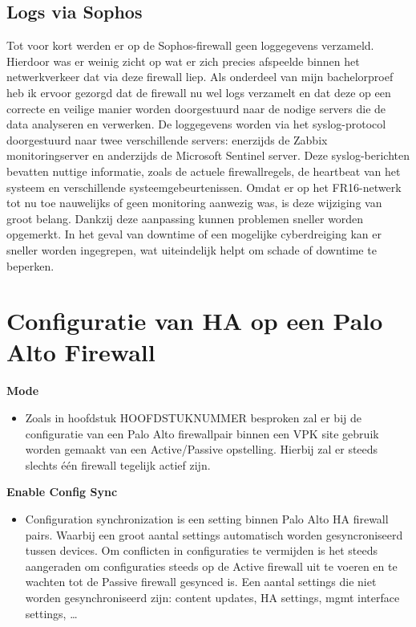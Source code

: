 \subsection{Logs via Sophos}
Tot voor kort werden er op de Sophos-firewall geen loggegevens verzameld. Hierdoor was er weinig zicht op wat er zich precies afspeelde binnen het netwerkverkeer dat via deze firewall liep. Als onderdeel van mijn bachelorproef heb ik ervoor gezorgd dat de firewall nu wel logs verzamelt en dat deze op een correcte en veilige manier worden doorgestuurd naar de nodige servers die de data analyseren en verwerken.
De loggegevens worden via het syslog-protocol doorgestuurd naar twee verschillende servers: enerzijds de Zabbix monitoringserver en anderzijds de Microsoft Sentinel server. Deze syslog-berichten bevatten nuttige informatie, zoals de actuele firewallregels, de heartbeat van het systeem en verschillende systeemgebeurtenissen.
Omdat er op het FR16-netwerk tot nu toe nauwelijks of geen monitoring aanwezig was, is deze wijziging van groot belang. Dankzij deze aanpassing kunnen problemen sneller worden opgemerkt. In het geval van downtime of een mogelijke cyberdreiging kan er sneller worden ingegrepen, wat uiteindelijk helpt om schade of downtime te beperken.



\section{Configuratie van HA op een Palo Alto Firewall}

\textbf{Mode}
    \begin{itemize}[label=\textbullet]
        \item Zoals in hoofdstuk HOOFDSTUKNUMMER besproken zal er bij de configuratie van een Palo Alto firewallpair binnen een VPK site gebruik worden gemaakt van een Active/Passive opstelling. Hierbij zal er steeds slechts één firewall tegelijk actief zijn.
    \end{itemize}

\textbf{Enable Config Sync}
    \begin{itemize}[label=\textbullet]
        \item Configuration synchronization is een setting binnen Palo Alto HA firewall pairs. Waarbij een groot aantal settings automatisch worden gesyncroniseerd tussen devices. Om conflicten in configuraties te vermijden is het steeds aangeraden om configuraties steeds op de Active firewall uit te voeren en te wachten tot de Passive firewall gesynced is. Een aantal settings die niet worden gesynchroniseerd zijn: content updates, HA settings, mgmt interface settings, \ldots 
    \end{itemize}



